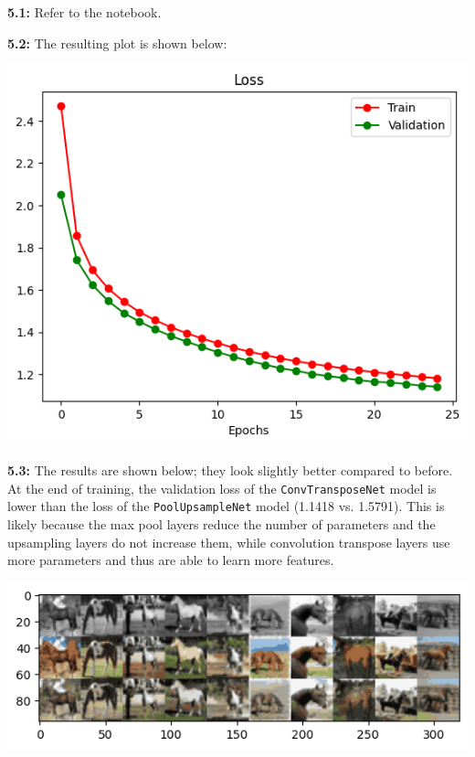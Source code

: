 \documentclass[12pt]{article}
\begin{document}
\textbf{5.1:} Refer to the notebook.

\textbf{5.2:} The resulting plot is shown below:
\begin{center}
    \includegraphics[scale=.75]{5.2.png}
\end{center}

\textbf{5.3:} The results are shown below; they look slightly better compared to before. At the end of training, the validation loss of the \texttt{ConvTransposeNet} model is lower than the loss of the \texttt{PoolUpsampleNet} model (1.1418 vs. 1.5791). This is likely because the max pool layers reduce the number of parameters and the upsampling layers do not increase them, while convolution transpose layers use more parameters and thus are able to learn more features.
\begin{center}
    \includegraphics[scale=.75]{5.3.png}
\end{center}
\end{document}
